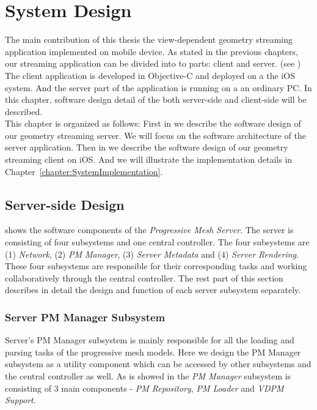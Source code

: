 \chapter{System Design}
\label{chapter:SystemDesign}


The main contribution of this thesis the view-dependent geometry streaming application implemented on mobile device. As stated in the previous chapters, our streaming application can be divided into to parts: client and server. (see ) The client application is developed in Objective-C and deployed on a the iOS system. And the server part of the application is running on a an ordinary PC. In this chapter, software design detail of the both server-side and client-side will be described. \\

This chapter is organized as follows: First in  we describe the software design of our geometry streaming server. We will focus on the software architecture of the server application. Then in  we describe the software design of our geometry streaming client on iOS. And we will illustrate the implementation details in Chapter~\ref{chapter:SystemImplementation}.

\section{Server-side Design}
\label{section:serverdesign}



 shows the software components of the \emph{Progressive Mesh Server}. The server is consisting of four subsystems and one central controller. The four subsystems are (1) \emph{Network}, (2) \emph{PM Manager}, (3) \emph{Server Metadata} and (4) \emph{Server Rendering}. These four subsystems are responsible for their corresponding tasks and working collaboratively through the central controller. The rest part of this section describes in detail the design and function of each server subsystem separately. 


\subsection{Server PM Manager Subsystem}
\label{section:svrpmmangr}

Server's PM Manager subsystem is mainly responsible for all the loading and parsing tasks of the progressive mesh models. Here we design the PM Manager subsystem as a utility component which can be accessed by other subsystems and the central controller as well. As is showed in  the \emph{PM Manager} subsystem is consisting of 3 main components - \emph{PM Repository}, \emph{PM Loader} and \emph{VDPM Support}. \\

